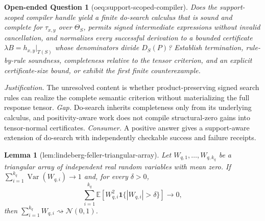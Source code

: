 \documentclass{article}
\newtheorem{lemma}{Lemma}
\newtheorem{openendedquestion}{Open-ended Question}
\begin{document}
\begin{openendedquestion}[oeq:support-scoped-compiler]\label{oeq:support-scoped-compiler}
Does the support-scoped compiler handle yield a finite do-search calculus that is sound and complete for \(\tau_{x,y}\) over \(\Theta_S\), permits signed intermediate expressions without invalid cancellation, and normalizes every successful derivation to a bounded certificate \(\lambda B=h_{x,y}|_{T(S)}\) whose denominators divide \(D_S(P)\)? Establish termination, rule-by-rule soundness, completeness relative to the tensor criterion, and an explicit certificate-size bound, or exhibit the first finite counterexample.
\end{openendedquestion}
\par\smallskip\noindent \textit{Justification.} The unresolved content is whether product-preserving signed search rules can realize the complete semantic criterion without materializing the full response tensor. \textit{Gap.} Do-search inherits completeness only from its underlying calculus, and positivity-aware work does not compile structural-zero gains into tensor-normal certificates. \textit{Consumer.} A positive answer gives a support-aware extension of do-search with independently checkable success and failure receipts.

\begin{lemma}[lem:lindeberg-feller-triangular-array]\label{lem:lindeberg-feller-triangular-array}
Let \(W_{q,1},\ldots,W_{q,k_q}\) be a triangular array of independent real random variables with mean zero.  If \(\sum_{i=1}^{k_q}\operatorname{Var}(W_{q,i})\to1\) and, for every \(\delta>0\),
\[
\sum_{i=1}^{k_q}\mathbb E\!\left[W_{q,i}^2\mathbf 1\{|W_{q,i}|>\delta\}\right]\longrightarrow0,
\]
then \(\sum_{i=1}^{k_q}W_{q,i}\rightsquigarrow\mathcal N(0,1)\).
\end{lemma}
\end{document}

